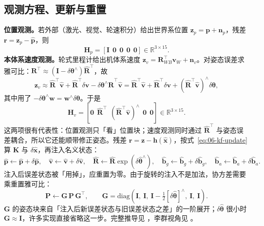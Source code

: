 \subsection{观测方程、更新与重置}

\textbf{位置观测。}若外部（激光、视觉、轮速积分）给出世界系位置 $\bm{z}_p=\bm{p}+\bm{n}_p$，残差 $\bm{r}=\bm{z}_p-\hat{\bm{p}}$，则
\begin{equation}
  \bm{H}_p = \left[\bm{I}\ \ \bm{0}\ \ \bm{0}\ \ \bm{0}\ \ \bm{0}\right]\in\mathbb{R}^{3\times15}.
\end{equation}
\textbf{本体系速度观测。}轮式里程计给出机体系速度 $\bm{z}_v=\bm{R}_{WB}^{\top}\bm{v}_W+\bm{n}_v$。对姿态误差求雅可比：$\bm{R}^{\top}\approx(\bm{I}-\delta\bm{\theta}^{\wedge})\hat{\bm{R}}^{\top}$，故
\begin{equation}
  \bm{z}_v \approx \hat{\bm{R}}^{\top}\hat{\bm{v}}+\hat{\bm{R}}^{\top}\delta\bm{v}
  -\delta\bm{\theta}^{\wedge}\hat{\bm{R}}^{\top}\hat{\bm{v}}
  = \hat{\bm{R}}^{\top}\hat{\bm{v}}+\hat{\bm{R}}^{\top}\delta\bm{v}
  +\left(\hat{\bm{R}}^{\top}\hat{\bm{v}}\right)^{\wedge}\delta\bm{\theta},
\end{equation}
其中用了 $-\delta\bm{\theta}^{\wedge}\bm{w}=\bm{w}^{\wedge}\delta\bm{\theta}$。于是
\begin{equation}
  \bm{H}_v = \left[\bm{0}\ \ \hat{\bm{R}}^{\top}\ \ \left(\hat{\bm{R}}^{\top}\hat{\bm{v}}\right)^{\wedge}\ \ \bm{0}\ \ \bm{0}\right]\in\mathbb{R}^{3\times15}.
  \label{eq:06-Hv}
\end{equation}
这两项很有代表性：位置观测只「看」位置块；速度观测同时通过 $\hat{\bm{R}}^{\top}$ 与姿态误差耦合，所以它还能顺带修正姿态。残差 $\bm{r}=\bm{z}-\bm{h}(\hat{\bm{x}})$，按式~\eqref{eq:06-kf-update} 算 $\bm{K}$ 与 $\delta\hat{\bm{x}}$，再注入名义状态：
\begin{equation}
  \hat{\bm{p}}\leftarrow\hat{\bm{p}}+\delta\hat{\bm{p}},\quad
  \hat{\bm{v}}\leftarrow\hat{\bm{v}}+\delta\hat{\bm{v}},\quad
  \hat{\bm{R}}\leftarrow\hat{\bm{R}}\exp\left(\delta\hat{\bm{\theta}}^{\wedge}\right),\quad
  \hat{\bm{b}}_g\leftarrow\hat{\bm{b}}_g+\delta\hat{\bm{b}}_g,\quad
  \hat{\bm{b}}_a\leftarrow\hat{\bm{b}}_a+\delta\hat{\bm{b}}_a.
  \label{eq:06-inject}
\end{equation}
注入后误差状态被「用掉」，应重置为零。由于旋转的注入不是加法，协方差需要乘重置雅可比：
\begin{equation}
  \bm{P}\leftarrow\bm{G}\,\bm{P}\,\bm{G}^{\top},
  \qquad
  \bm{G}=\mathrm{diag}\left(\bm{I},\ \bm{I},\ \bm{I}-\tfrac{1}{2}\left[\delta\hat{\bm{\theta}}\right]^{\wedge},\ \bm{I},\ \bm{I}\right).
  \label{eq:06-reset}
\end{equation}
$\bm{G}$ 的姿态块来自「注入后新误差状态与旧误差状态之差」的一阶展开；$\delta\hat{\bm{\theta}}$ 很小时 $\bm{G}\approx\bm{I}$，许多实现直接省略这一步。完整推导见 \cite{sola2017eskf}，李群视角见 \cite{barfoot2017state}。

